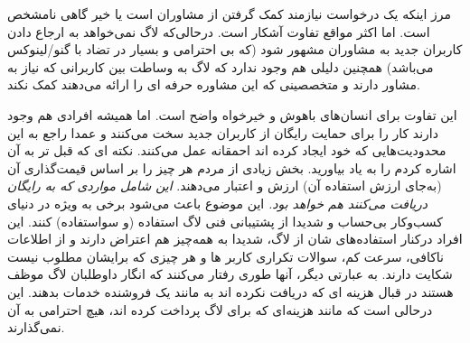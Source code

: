 مرز اینکه یک درخواست نیازمند کمک گرفتن از مشاوران است یا خیر گاهی
نامشخص است. اما اکثر مواقع تفاوت آشکار است.
درحالی‌که لاگ نمی‌خواهد به ارجاع دادن کاربران جدید به مشاوران مشهور
شود (که بی احترامی و بسیار در تضاد با گنو/لینوکس می‌باشد) همچنین
دلیلی هم وجود ندارد که لاگ به وساطت بین کاربرانی که نیاز به مشاور دارند
و متخصصینی که این مشاوره حرفه ای را ارائه می‌دهند کمک نکند.

\begin{caveat}
این تفاوت برای انسان‌های باهوش و خیرخواه واضح است.
اما همیشه افرادی هم وجود دارند کار را برای حمایت رایگان
از کاربران جدید سخت می‌کنند و عمدا راجع به این محدودیت‌هایی
که خود ایجاد کرده اند احمقانه عمل می‌کنند. نکته ای که قبل تر
به آن اشاره کردم را به یاد بیاورید. بخش زیادی از مردم
هر چیز را بر اساس قیمت‌گذاری آن (به‌جای ارزش استفاده آن)
ارزش و اعتبار می‌دهند.
{\itshape
این شامل مواردی که به رایگان دریافت می‌کنند هم خواهد بود.
}
این موضوع باعث می‌شود برخی به ویژه در دنیای کسب‌و‌کار بی‌حساب و شدیدا
از پشتیبانی فنی لاگ استفاده (و سواستفاده) کنند.
این افراد درکنار استفاده‌های شان از لاگ، شدیدا به همه‌چیز هم اعتراض
دارند و از اطلاعات ناکافی، سرعت کم، سوالات تکراری کاربر ها و
هر چیزی که برایشان مطلوب نیست شکایت دارند. به عبارتی دیگر،
آنها طوری رفتار می‌کنند که انگار داوطلبان لاگ موظف هستند در قبال
هزینه ای که دریافت نکرده اند به مانند یک فروشنده خدمات بدهند.
این درحالی است که مانند هزینه‌ای که برای لاگ پرداخت کرده اند،
هیچ احترامی به آن نمی‌گذارند.
\end{caveat}

